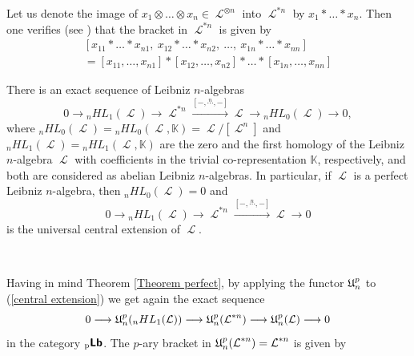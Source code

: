 \documentclass[12pt, reqno]{amsart}
\newcommand{\lra}{\longrightarrow}
\def\pLb{\operatorname{{}_{p}\textbf{\textsf{Lb}}}}
\def\U{\operatorname{\frak{U}}}
\def\ele{\operatorname{\mathcal{L}}}
\begin{document}
Let us denote the image of $x_1 \otimes \dots \otimes x_n \in {\ele}^{\otimes n}$ into ${\ele}^{\ast n}$  by $x_1 \ast \dots \ast x_n$. Then one verifies  (see \cite{Ca}) that the bracket in ${\ele}^{\ast n}$ is given by
\begin{equation}
\begin{array}{l}
[x_{11} \ast \dots \ast x_{n1}, \ x_{12} \ast \dots \ast x_{n2}, \ \dots , \ x_{1n} \ast \dots \ast x_{nn}] \\

= [x_{11}, \dots, x_{n1}] \ast [x_{12}, \dots, x_{n2}] \ast \dots \ast [ x_{1n}, \dots, x_{nn}]
\end{array}
\end{equation}


There is an exact sequence of Leibniz $n$-algebras
\begin{equation*} \label{4 term seq}
0 \lra {_n}HL_1({\ele}) \lra {\ele}^{\ast n} \stackrel{[-,\stackrel{n}{\cdots}, -]}{\lra} {\ele} \to {_n}HL_0({\ele})\lra  0,
\end{equation*}
where ${_n}HL_0({\ele})={_n}HL_0({\ele}, \mathbb{K})= \ele / [\ele^n]$ and ${_n}HL_1({\ele})={_n}HL_1({\ele}, \mathbb{K})$ are the zero and the first homology of the Leibniz $n$-algebra ${\ele}$ with coefficients in the trivial co-representation $\mathbb{K}$, respectively, and both are considered as abelian Leibniz $n$-algebras. In particular, if $\ele$ is a perfect Leibniz $n$-algebra, then ${_n}HL_0({\ele})=0$ and
\begin{equation} \label{central extension}
0 \lra {_n}HL_1({\ele}) \lra {\ele}^{\ast n} \stackrel{[-,\stackrel{n}{\cdots}, -]}{\lra} {\ele} \lra 0
\end{equation}
is the universal central extension of $\ele$.

\

Having in mind  Theorem \ref{Theorem perfect}, by applying the functor $\U_n^p$ to (\ref{central extension}) we get again the exact sequence
\begin{equation} \label{central extension in pLb}
0 \lra \U_n^p({_n}HL_1({\ele}) )\lra \U_n^p({\ele}^{\ast n}) \stackrel{}{\lra} \U_n^p({\ele}) \lra 0
\end{equation}
in the category $\pLb$. The $p$-ary bracket in  $\U_n^p({\ele}^{\ast n} )={\ele}^{\ast n}$ is given by
\end{document}
